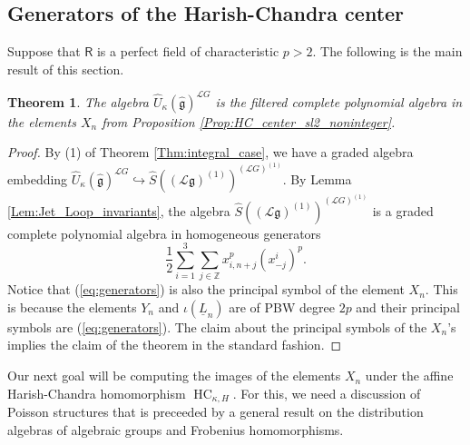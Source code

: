 \documentclass{amsart}
\newtheorem{Thm}{Theorem}[subsection]
\newtheorem{Prop}[Thm]{Proposition}
\theoremstyle{definition}
\newcommand{\Ring}{\mathsf{R}}
\newcommand{\g}{\mathfrak{g}}
\newcommand{\hg}{\hat{\mathfrak{g}}}
\newcommand{\ffr}{\mathrm{ffr}}
\newcommand{\HC}{\mathrm{HC}} %
\newcommand{\Z}{\mathbb{Z}}
\newcommand{\Loop}{\mathscr{L}}
\numberwithin{equation}{section}
\begin{document}






\subsection{Generators of the Harish-Chandra center}
Suppose that $\Ring$ is a perfect field of characteristic $p>2$.
The following is the main result of this section.
\begin{Thm}\label{Thm:sl2_HC_center}
The algebra $\widehat{U}_{\kappa}(\hg)^{\Loop G}$ is the filtered complete polynomial algebra in the elements $X_n$ from Proposition \ref{Prop:HC_center_sl2_noninteger}.
\end{Thm}
\begin{proof}
By (1) of Theorem \ref{Thm:integral_case}, we have a graded algebra embedding 
$\widehat{U}_{\kappa}(\hg)^{\Loop G}\hookrightarrow 
\widehat{S}\left((\Loop \g)^{(1)}\right)^{(\Loop G)^{(1)}}$. By Lemma \ref{Lem:Jet_Loop_invariants}, the algebra 
$\widehat{S}\left((\Loop \g)^{(1)}\right)^{(\Loop G)^{(1)}}$ is a graded complete polynomial algebra in homogeneous generators
\begin{equation}\label{eq:generators}
\frac{1}{2}\sum_{i=1}^3\sum_{j\in \Z}x_{i,n+j}^p(x^i_{-j})^p.
\end{equation}
Notice that (\ref{eq:generators}) is also the principal symbol of the element $X_n$. This is because
the elements $Y_n$ and $\iota(\underline{L}_n)$ are of PBW degree $2p$ and their principal symbols 
are (\ref{eq:generators}). The claim about the principal symbols of the $X_n$'s implies the claim of the theorem in the standard fashion. 
\end{proof}

Our next goal will be computing the images of the elements $X_n$ under the affine Harish-Chandra homomorphism $\operatorname{HC}_{\kappa, H}$. For this, we need a discussion of Poisson structures that is preceeded by a general result on the distribution algebras of algebraic groups and Frobenius homomorphisms.
\end{document}
